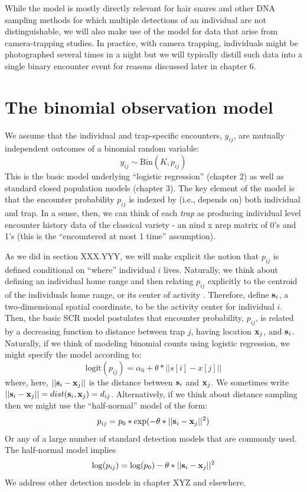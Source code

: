 While the model is mostly directly relevant
for hair snares and other DNA sampling methods for which multiple
detections of an individual are not distinguishable, 
we will also make use of the model for data that arise from
camera-trapping studies. In practice, with camera trapping,
individuals might be photographed several times in a night but we will
typically distill such data into a single binary encounter event for
reasons discussed later in chapter 6.


\section{The binomial observation model }

We assume that the individual and trap-specific encounters, $y_{ij}$,
are mutually independent outcomes of a binomial random variable:
\[
	y_{ij} \sim \mbox{Bin}(K, p_{ij})
\]
This is the basic model underlying ``logistic regression'' (chapter 2)
as well as standard closed population models (chapter 3). The key
element of the model is that the encounter probability $p_{ij}$ is
indexed by (i.e., depends on) both individual and trap. In a sense,
then, we can think of each {\it trap} as producing individual level
encounter history data of the classical variety - an nind x nrep
matrix of 0's and 1's (this is the ``encountered at most 1 time''
assumption).


As we did in section XXX.YYY, we will make explicit the notion that
$p_{ij}$ is defined conditional on ``where'' individual $i$
lives. Naturally, we think about defining an individual home range and
then relating $p_{ij}$ explicitly to the centroid of the individuals
home range, or its center of activity \citep{efford:2004, borchers_efford:2008, royle_young:2008}.  
Therefore, define ${\bf s}_{i}$, a two-dimensional spatial coordinate,
to be the activity center for individual $i$. Then, the basic SCR
model postulates that encounter probability, $p_{ij}$, is related by a
decreasing function to distance between trap $j$, having location
${\bf x}_{j}$, and ${\bf s}_{i}$.  Naturally, if we think of modeling binomial counts using logistic regression, we might specify the model according to:
\[
	\mbox{logit}(p_{ij}) = \alpha_{0} + \theta *||s[i]-x[j]||				
\]
where, here, $||{\bf s}_{i}-{\bf x}_{j}||$ is the distance between
${\bf s}_{i}$ and ${\bf x}_{j}$. We sometimes write $||{\bf
  s}_{i}-{\bf x}_{j}|| = dist({\bf s}_{i},{\bf x}_{j}) = d_{ij}$. Alternatively, if we think about distance sampling then we might use the ``half-normal'' model of the form:
\[
p_{ij} = p_{0}*\exp(-\theta*||{\bf s}_{i}-{\bf x}_{j}||^2)
\]
Or any of a large number of standard detection models that are commonly used. The half-normal model implies 
\[
\log(p_{ij})  = \log(p_{0}) - \theta*||{\bf s}_{i}-{\bf x}_{j}||^2
\]
We address other detection models in chapter XYZ and elsewhere. 

